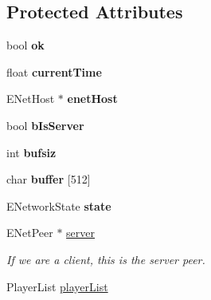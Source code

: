\subsection*{\-Protected \-Attributes}
\begin{DoxyCompactItemize}
\item 
\hypertarget{classNetwork_aad43b0f0f4ff64e90ffb1789dd8e99fc}{
bool {\bfseries ok}}
\label{d5/d16/classNetwork_aad43b0f0f4ff64e90ffb1789dd8e99fc}

\item 
\hypertarget{classNetwork_a7d2924bf7015344715a62583f3a9e89d}{
float {\bfseries current\-Time}}
\label{d5/d16/classNetwork_a7d2924bf7015344715a62583f3a9e89d}

\item 
\hypertarget{classNetwork_a7268216e5b37822be239f61e2edc1afe}{
\-E\-Net\-Host $\ast$ {\bfseries enet\-Host}}
\label{d5/d16/classNetwork_a7268216e5b37822be239f61e2edc1afe}

\item 
\hypertarget{classNetwork_a6a3fd4306f434be321ccbf8a739dee65}{
bool {\bfseries b\-Is\-Server}}
\label{d5/d16/classNetwork_a6a3fd4306f434be321ccbf8a739dee65}

\item 
\hypertarget{classNetwork_aeb1b570d742541573b19ba20c76dabc3}{
int {\bfseries bufsiz}}
\label{d5/d16/classNetwork_aeb1b570d742541573b19ba20c76dabc3}

\item 
\hypertarget{classNetwork_a2293dec40555b8525077453a7b42d933}{
char {\bfseries buffer} \mbox{[}512\mbox{]}}
\label{d5/d16/classNetwork_a2293dec40555b8525077453a7b42d933}

\item 
\hypertarget{classNetwork_a72e558a6667a9f65d770081401e9124a}{
\-E\-Network\-State {\bfseries state}}
\label{d5/d16/classNetwork_a72e558a6667a9f65d770081401e9124a}

\item 
\hypertarget{classNetwork_a61d7f57049bb03db5790c070af231b57}{
\-E\-Net\-Peer $\ast$ \hyperlink{classNetwork_a61d7f57049bb03db5790c070af231b57}{server}}
\label{d5/d16/classNetwork_a61d7f57049bb03db5790c070af231b57}

\begin{DoxyCompactList}\small\item\em \-If we are a client, this is the server peer. \end{DoxyCompactList}\item 
\hypertarget{classNetwork_aff7768fa8c9af0b0214d8cc02148d7e0}{
\-Player\-List \hyperlink{classNetwork_aff7768fa8c9af0b0214d8cc02148d7e0}{player\-List}}
\label{d5/d16/classNetwork_aff7768fa8c9af0b0214d8cc02148d7e0}


\end{DoxyCompactItemize}
